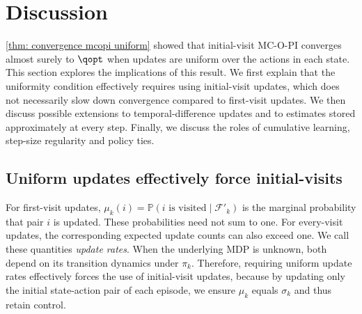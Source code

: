 \section{Discussion}
\label{sec: discussion}

\autoref{thm: convergence mcopi uniform} showed that initial-visit MC-O-PI converges almost surely to $\qopt$ 
when updates are uniform over the actions in each state.
% 
% 
This section explores the implications of this result.
We first explain that the uniformity condition effectively requires using initial-visit updates, which does not necessarily slow down convergence compared to first-visit updates.
We then discuss possible extensions to temporal-difference updates and to estimates stored approximately at every step.
Finally, we discuss the roles of cumulative learning, step-size regularity and policy ties.




\subsection{Uniform updates effectively force initial-visits}


For first-visit updates, $\mu_k(i)=\mathbb P(i\text{ is visited}\mid\mathcal F'_k)$ is the marginal probability that pair $i$ is updated. These probabilities need not sum to one. For every-visit updates, the corresponding expected update counts can also exceed one. We call these quantities \emph{update rates}. When the underlying MDP is unknown, both depend on its transition dynamics under $\pi_k$.
Therefore, requiring uniform update rates effectively forces the use of initial-visit updates,
because by updating only the initial state-action pair of each episode, we ensure $\mu_k$ equals $\sigma_k$ and thus retain control.

